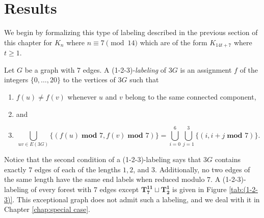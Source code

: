 \section{Results}\label{sec:7,8result}
We begin by formalizing this type of labeling described in the previous section of this chapter for $K_{n}$ where $n\equiv 7\pmod{14}$ which are of the form $K_{14t+7}$ where $t\geq 1$.
\begin{definition}\label{def:1-2-3}
    Let $G$ be a graph with $7$ edges. A (1-2-3)-\emph{labeling} of $3G$ is an assignment $f$ of the integers $\{0,\dots,20\}$ to the vertices of $3G$ such that
    \begin{enumerate}
        \item $f(u) \neq f(v)$ whenever $u$ and $v$ belong to the same connected component,
        \item[] and
        \item $$\bigcup_{uv\in E(3G)} \{(f(u)\; \textbf{mod } 7,f(v)\; \textbf{mod } 7)\}= \bigcup_{i=0}^{6} \bigcup_{j=1}^{3} \{(i,i+j \; \textbf{mod } 7)\}.$$
    \end{enumerate}

\end{definition}
Notice that the second condition of a (1-2-3)-labeling says that $3G$ contains exactly $7$ edges of each of the lengths $1,2$, and $3$. Additionally, no two edges of the same length have the same end labels when reduced modulo $7.$ A (1-2-3)-labeling of every forest with $7$ edges except $\mathbf{T_{7}^{11}}\sqcup\mathbf{T_{2}^{1}}$ is given in Figure \ref{tab:(1-2-3)}. This exceptional graph does not admit such a labeling, and we deal with it in Chapter \ref{chap:special case}. 

